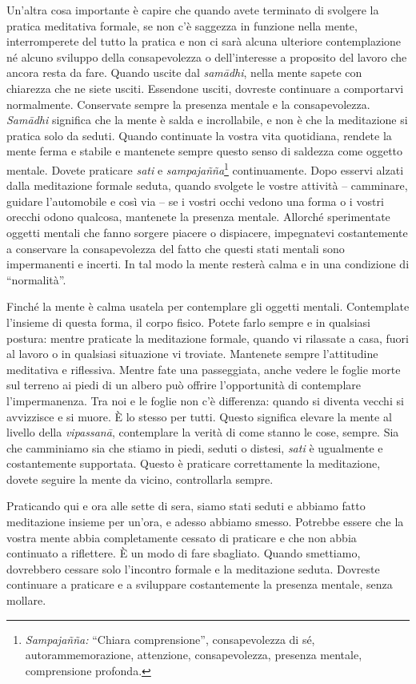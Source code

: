 Un'altra cosa importante è capire che quando avete terminato di svolgere
la pratica meditativa formale, se non c'è saggezza in funzione nella
mente, interromperete del tutto la pratica e non ci sarà alcuna
ulteriore contemplazione né alcuno sviluppo della consapevolezza o
dell'interesse a proposito del lavoro che ancora resta da fare. Quando
uscite dal \emph{samādhi}, nella mente sapete con chiarezza che ne siete
usciti. Essendone usciti, dovreste continuare a comportarvi normalmente.
Conservate sempre la presenza mentale e la consapevolezza.
\emph{Samādhi} significa che la mente è salda e incrollabile, e non è
che la meditazione si pratica solo da seduti. Quando continuate la
vostra vita quotidiana, rendete la mente ferma e stabile e mantenete
sempre questo senso di saldezza come oggetto mentale. Dovete praticare
\emph{sati} e \emph{sampajañña}\footnote{\emph{Sampajañña:} ``Chiara
  comprensione'', consapevolezza di sé, autorammemorazione, attenzione,
  consapevolezza, presenza mentale, comprensione profonda.}
continuamente. Dopo esservi alzati dalla meditazione formale seduta,
quando svolgete le vostre attività -- camminare, guidare l'automobile e
così via -- se i vostri occhi vedono una forma o i vostri orecchi odono
qualcosa, mantenete la presenza mentale. Allorché sperimentate oggetti
mentali che fanno sorgere piacere o dispiacere, impegnatevi
costantemente a conservare la consapevolezza del fatto che questi stati
mentali sono impermanenti e incerti. In tal modo la mente resterà calma
e in una condizione di ``normalità''.

Finché la mente è calma usatela per contemplare gli oggetti mentali.
Contemplate l'insieme di questa forma, il corpo fisico. Potete farlo
sempre e in qualsiasi postura: mentre praticate la meditazione formale,
quando vi rilassate a casa, fuori al lavoro o in qualsiasi situazione vi
troviate. Mantenete sempre l'attitudine meditativa e riflessiva. Mentre
fate una passeggiata, anche vedere le foglie morte sul terreno ai piedi
di un albero può offrire l'opportunità di contemplare l'impermanenza.
Tra noi e le foglie non c'è differenza: quando si diventa vecchi si
avvizzisce e si muore. È lo stesso per tutti. Questo significa elevare
la mente al livello della \emph{vipassanā}, contemplare la verità di
come stanno le cose, sempre. Sia che camminiamo sia che stiamo in piedi,
seduti o distesi, \emph{sati} è ugualmente e costantemente supportata.
Questo è praticare correttamente la meditazione, dovete seguire la mente
da vicino, controllarla sempre.

Praticando qui e ora alle sette di sera, siamo stati seduti e abbiamo
fatto meditazione insieme per un'ora, e adesso abbiamo smesso. Potrebbe
essere che la vostra mente abbia completamente cessato di praticare e
che non abbia continuato a riflettere. È un modo di fare sbagliato.
Quando smettiamo, dovrebbero cessare solo l'incontro formale e la
meditazione seduta. Dovreste continuare a praticare e a sviluppare
costantemente la presenza mentale, senza mollare.

